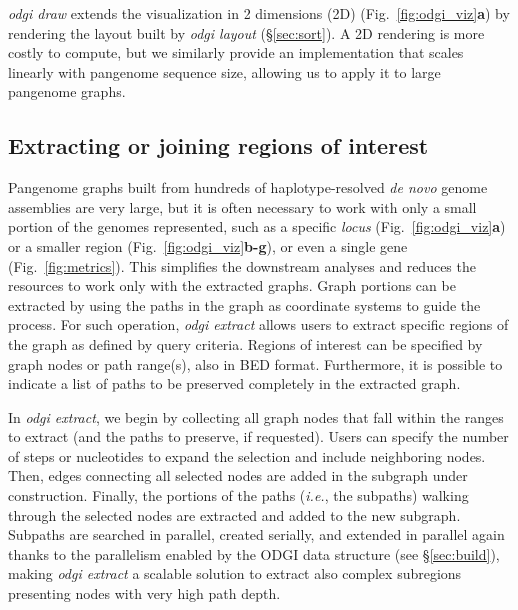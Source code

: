 \documentclass{bioinfo}
\begin{document}
\textit{odgi draw} extends the visualization in 2 dimensions (2D)  (Fig.~\ref{fig:odgi_viz}\textbf{a}) by rendering the layout built by \textit{odgi layout} (\S\ref{sec:sort}).
A 2D rendering is more costly to compute, but we similarly provide an implementation that scales linearly with pangenome sequence size, allowing us to apply it to large pangenome graphs.


\subsection{Extracting or joining regions of interest}
\label{sec:extract}

Pangenome graphs built from hundreds of haplotype-resolved \textit{de novo} genome assemblies are very large, but it is often necessary to work with only a small portion of the genomes represented,
such as a specific \textit{locus} (Fig.~\ref{fig:odgi_viz}\textbf{a}) or a smaller region (Fig.~\ref{fig:odgi_viz}\textbf{b-g}), or even a single gene (Fig.~\ref{fig:metrics}).
This simplifies the downstream analyses and reduces the resources to work only with the extracted graphs.
Graph portions can be extracted by using the paths in the graph as coordinate systems to guide the process. For such operation, \textit{odgi extract} allows users to extract specific regions of the graph as defined by query criteria.
Regions of interest can be specified by graph nodes or path range(s), also in BED format. Furthermore, it is possible to indicate a list of paths to be preserved completely in the extracted graph.

In \textit{odgi extract}, we begin by collecting all graph nodes that fall within the ranges to extract (and the paths to preserve, if requested).
Users can specify the number of steps or nucleotides to expand the selection and include neighboring nodes.
Then, edges connecting all selected nodes are added in the subgraph under construction.
Finally, the portions of the paths (\textit{i.e.}, the subpaths) walking through the selected nodes are extracted and added to the new subgraph.
Subpaths are searched in parallel, created serially, and extended in parallel again thanks to the parallelism enabled by the ODGI data structure (see \S\ref{sec:build}), making \textit{odgi extract} a scalable solution to extract also complex subregions presenting nodes with very high path depth.

\end{document}
